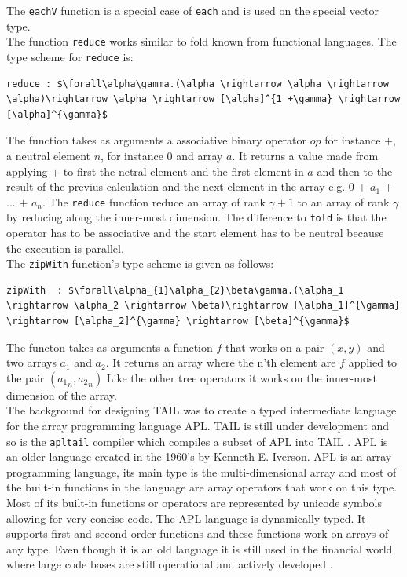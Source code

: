 \documentclass[11pt]{article}
\begin{document}
The {\tt eachV} function is a special case of {\tt each} and is used on the special vector type.\\

The function {\tt reduce} works similar to fold known from functional languages. The type scheme for {\tt reduce} is:
\begin{lstlisting}[numbers=none,frame=none]
reduce : $\forall\alpha\gamma.(\alpha \rightarrow \alpha \rightarrow \alpha)\rightarrow \alpha \rightarrow [\alpha]^{1 +\gamma} \rightarrow [\alpha]^{\gamma}$
\end{lstlisting}
The function takes as arguments a associative binary operator $op$ for instance $+$, a neutral element $n$, for instance 0 and array $a$.
It returns a value made from applying $+$  to first the netral element and the first element in $a$ and then to the result of the previus calculation and the next element in the array e.g. 0 $+$ $a_1$ $+$ ... $+$ $a_n$.
The {\tt reduce} function reduce an array of rank $\gamma+1$ to an array of rank $\gamma$ by reducing along the inner-most dimension.
The difference to {\tt fold} is that the operator has to be associative and the start element has to be neutral
because the execution is parallel.\\

The {\tt zipWith} function's type scheme is given as follows: 
\begin{lstlisting}[numbers=none,frame=none]
zipWith  : $\forall\alpha_{1}\alpha_{2}\beta\gamma.(\alpha_1 \rightarrow \alpha_2 \rightarrow \beta)\rightarrow [\alpha_1]^{\gamma} \rightarrow [\alpha_2]^{\gamma} \rightarrow [\beta]^{\gamma}$
\end{lstlisting}
The functon takes as arguments a function $f$ that works on a pair $(x,y)$ and two arrays $a_1$ and $a_2$. It returns an array where the n'th element are $f$ applied to the pair $({a_{1}}_n,{a_{2}}_n)$ 
Like the other tree operators it works on the inner-most dimension of the array\cite{ElsmanDybdal:Array:2014}.\\

The background for designing TAIL was to create a typed intermediate language for the array programming language APL. TAIL is still under development and so is the {\tt apltail} compiler which compiles a subset of APL into TAIL \cite{ElsmanDybdal:Array:2014}.
APL is an older language created in the 1960's by Kenneth E. Iverson.
APL is an array programming language, its main type is the multi-dimensional array 
and most of the built-in functions in the language are array operators that work on this type. 
Most of its built-in functions or operators are represented by unicode symbols allowing for very concise code.
The APL language is dynamically typed. It supports first and second order functions and these functions work on arrays of any type. 
Even though it is an old language it is still used in the financial world 
where large code bases are still operational and actively developed \cite{ElsmanDybdal:Array:2014}. \\
\end{document}
